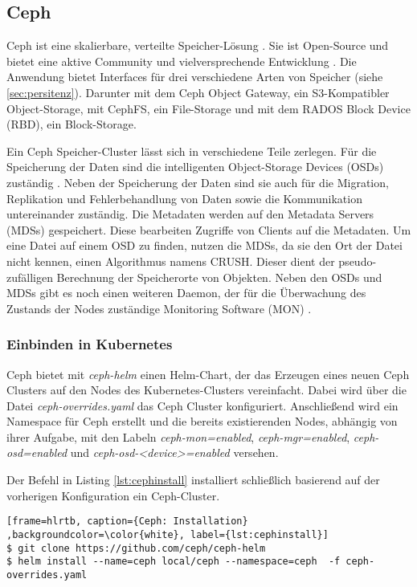 \subsection{Ceph}
Ceph ist eine skalierbare, verteilte Speicher-Lösung \cite{Weil:2006:CSH:1298455.1298485}. Sie ist Open-Source und bietet eine aktive Community und vielversprechende Entwicklung \cite{Du2018Cider:Storage}. Die Anwendung bietet Interfaces für drei verschiedene Arten von Speicher (siehe \ref{sec:persitenz}). Darunter mit dem Ceph Object Gateway, ein S3-Kompatibler Object-Storage, mit CephFS, ein File-Storage und mit dem RADOS Block Device (RBD), ein Block-Storage. \medskip

Ein Ceph Speicher-Cluster lässt sich in verschiedene Teile zerlegen. Für die Speicherung der Daten sind die intelligenten Object-Storage Devices (OSDs) zuständig \cite{Weil:2006:CSH:1298455.1298485}. Neben der Speicherung der Daten sind sie auch für die Migration, Replikation und Fehlerbehandlung von Daten sowie die Kommunikation untereinander zuständig. Die Metadaten werden auf den Metadata Servers (MDSs) gespeichert. Diese bearbeiten Zugriffe von Clients auf die Metadaten. Um eine Datei auf einem OSD zu finden, nutzen die MDSs, da sie den Ort der Datei nicht kennen, einen Algorithmus namens CRUSH. Dieser dient der pseudo-zufälligen Berechnung der Speicherorte von Objekten. Neben den OSDs und MDSs gibt es noch einen weiteren Daemon, der für die Überwachung des Zustands der Nodes zuständige Monitoring Software (MON) \cite[][]{cephcookbook}. 

\subsubsection{Einbinden in Kubernetes}
Ceph bietet mit \textit{ceph-helm} einen Helm-Chart, der das Erzeugen eines neuen Ceph Clusters auf den Nodes des Kubernetes-Clusters vereinfacht. Dabei wird über die Datei \textit{ceph-overrides.yaml} das Ceph Cluster konfiguriert. Anschließend wird ein Namespace für Ceph erstellt und die bereits existierenden Nodes, abhängig von ihrer Aufgabe, mit den Labeln \textit{ceph-mon=enabled}, \textit{ceph-mgr=enabled}, \textit{ceph-osd=enabled } und \textit{ceph-osd-<device>=enabled } versehen. \medskip

Der Befehl in Listing \ref{lst:cephinstall} installiert schließlich basierend auf der vorherigen Konfiguration ein Ceph-Cluster.
\lstset{language=bash}
\begin{lstlisting}[frame=hlrtb, caption={Ceph: Installation} ,backgroundcolor=\color{white}, label={lst:cephinstall}]
$ git clone https://github.com/ceph/ceph-helm
$ helm install --name=ceph local/ceph --namespace=ceph  -f ceph-overrides.yaml
\end{lstlisting}

